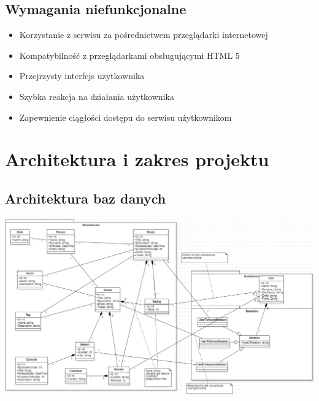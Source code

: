 \documentclass[12pt]{article}
\begin{document}
		\subsection{Wymagania niefunkcjonalne}
			\begin{itemize}
				\item Korzystanie z serwisu za pośrednictwem przeglądarki internetowej
				\item Kompatybilność z przeglądarkami obsługującymi HTML 5
				\item Przejrzysty interfejs użytkownika
				\item Szybka reakcja na działania użytkownika
				\item Zapewnienie ciągłości dostępu do serwisu użytkownikom
			\end{itemize}
	\section{Architektura i zakres projektu}
		\subsection{Architektura baz danych}
			\begin{center}
				\includegraphics[scale=0.5]{Class_FilmsDataBase.png}
			\end{center}
	\pagebreak
\end{document}
